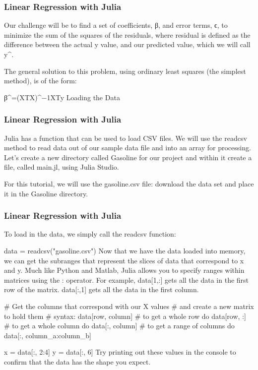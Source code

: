 \begin{frame}
\frametitle{Linear Regression with Julia}
\vscpace{-1cm}
\large
\begin{itemize}
Our challenge will be to find a set of coefficients, β, and error terms, ϵ, to minimize the sum of the squares of the residuals, where residual is defined as the difference between the actual y value, and our predicted value, which we will call y^.

The general solution to this problem, using ordinary least squares (the simplest method), is of the form:

β^=(XTX)^{−1}XTy
Loading the Data
\end{itemize}
\end{frame}
\begin{frame}
\frametitle{Linear Regression with Julia}
\vscpace{-1cm}
\large
\begin{itemize}
Julia has a function that can be used to load CSV files. We will use the readcsv method to read data out of our sample data file and into an array for processing. Let's create a new directory called Gasoline for our project and within it create a file, called main.jl, using Julia Studio.

For this tutorial, we will use the gasoline.csv file:  download the data set and place it in the Gasoline directory.
\end{itemize}
\end{frame}
\begin{frame}
\frametitle{Linear Regression with Julia}
\vscpace{-1cm}
\large
\begin{itemize}
To load in the data, we simply call the readcsv function:

data = readcsv("gasoline.csv")
Now that we have the data loaded into memory, we can get the subranges that represent the slices of data that correspond to x and y. Much like Python and Matlab, Julia allows you to specify ranges within matrices using the : operator. For example, data[1,:] gets all the data in the first row of the matrix. data[:,1] gets all the data in the first column.

# Get the columns that correspond with our X values 
# and create a new matrix to hold them
# syntax: data[row, column]
# to get a whole row do data[row, :]
# to get a whole column do data[:, column]
# to get a range of columns do data[:, column_a:column_b]
 
x = data[:, 2:4]
y = data[:, 6]
Try printing out these values in the console to confirm that the data has the shape you expect.
\end{itemize}
\end{frame}
